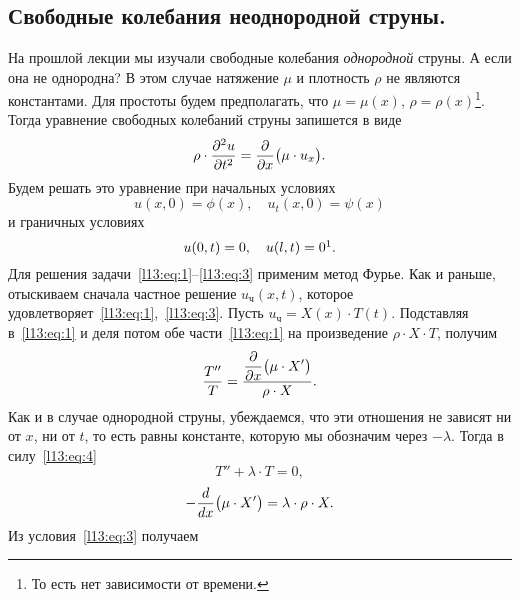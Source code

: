 	\chapter{}
\label{lecture13}
\section{Свободные колебания неоднородной струны.}
\label{lecture13section1}
На прошлой лекции мы изучали свободные колебания \emph{однородной} струны. А если она не однородна? В этом случае натяжение $\mu$ и плотность $\rho$ не являются константами. Для простоты будем предполагать, что $\mu=\mu(x)$, $\rho=\rho(x)$\footnote[1]{То есть нет зависимости от времени.}. Тогда уравнение свободных колебаний струны запишется в виде
\begin{equation}\label{l13:eq:1}
	\rho\cdot\frac{\partial^2u}{\partial t^2}=\frac{\partial}{\partial x}\big(\mu\cdot u_x\big).
\end{equation}
Будем решать это уравнение при начальных условиях
\begin{equation}\label{l13:eq:2}
	 u(x,0)=\phi(x),\quad u_t(x,0)=\psi(x)
\end{equation}
и граничных условиях
\begin{equation}\label{l13:eq:3}
	 u(0,t)=0,\quad u(l,t)=0\footnotemark{}.
\end{equation}%
\indent Для решения задачи~\eqref{l13:eq:1}--\eqref{l13:eq:3} применим метод Фурье. Как и раньше, отыскиваем сначала частное решение $u_{\text{ч}}(x,t)$, которое удовлетворяет~\eqref{l13:eq:1},~\eqref{l13:eq:3}. Пусть $u_{\text{ч}}=X(x)\cdot T(t)$. Подставляя в~\eqref{l13:eq:1} и деля потом обе части~\eqref{l13:eq:1} на произведение $\rho\cdot X\cdot T$, получим
\begin{equation}\label{l13:eq:4}
	\frac{T''}{T}=\frac{\displaystyle\frac{\partial}{\partial x}\big(\mu\cdot X'\big)}{\rho\cdot X}.
\end{equation} 
Как и в случае однородной струны, убеждаемся, что эти отношения не зависят ни от $x$, ни от $t$, то есть равны константе, которую мы обозначим через $-\lambda$. Тогда в силу~\eqref{l13:eq:4} 
\begin{equation}\label{l13:eq:5}
	 T''+\lambda\cdot T=0,
\end{equation}
\begin{equation}\label{l13:eq:6}
	 -\frac{d}{dx}\big(\mu\cdot X'\big)=\lambda\cdot\rho\cdot X.
\end{equation}
Из условия~\eqref{l13:eq:3} получаем
